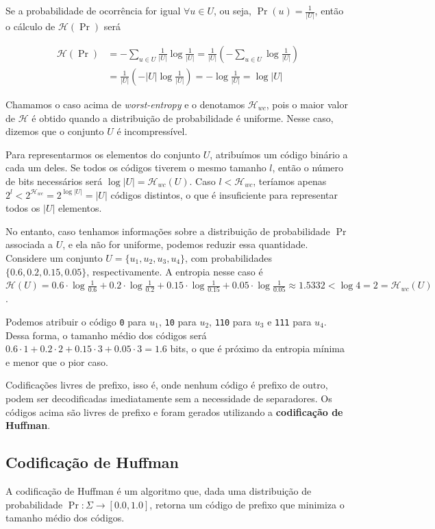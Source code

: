\documentclass[a4paper, 12pt, english, brazilian]{article}
\begin{document}
Se a probabilidade de ocorrência for igual $\forall u \in U$, ou seja, $\Pr(u) = \frac{1}{|U|}$, 
então o cálculo de $\mathcal{H}(\Pr)$ será

\begin{align*}
    \mathcal{H}(\Pr) &= -\sum_{u \in U}{\frac{1}{|U|}\log\frac{1}{|U|}} 
    = \frac{1}{|U|} \left(-\sum_{u \in U}{\log\frac{1}{|U|}}\right)\\
    &= \frac{1}{|U|} \left( -|U| \log\frac{1}{|U|} \right) = -\log\frac{1}{|U|} = \log|U|
\end{align*}

Chamamos o caso acima de \textit{worst-entropy} e o denotamos $\mathcal{H}_{wc}$, pois o maior valor de $\mathcal{H}$ é
obtido quando a distribuição de probabilidade é uniforme.  Nesse caso, dizemos que o 
conjunto $U$ é incompressível.

Para representarmos os elementos do conjunto $U$, atribuímos um código binário a cada um deles.
Se todos os códigos tiverem o mesmo tamanho $l$, então o número de bits necessários será 
$\log|U| = \mathcal{H}_{wc}(U)$. Caso $l <\mathcal{H}_{wc}$, teríamos apenas $2^{l} < 2^{\mathcal{H}_{wc}}
= 2^{\log|U|} = |U|$ códigos distintos, o que é insuficiente para representar todos os $|U|$ elementos.

No entanto, caso tenhamos informações sobre a distribuição de probabilidade $\Pr$ associada a $U$, e ela não
for uniforme, podemos reduzir essa quantidade. Considere um conjunto $U = \{u_1, u_2, u_3, u_4\}$,
com probabilidades $\{0.6, 0.2, 0.15, 0.05\}$, respectivamente. A entropia nesse caso é $\mathcal{H}(U) = 
0.6 \cdot \log\frac{1}{0.6} + 0.2 \cdot \log\frac{1}{0.2} 
+ 0.15 \cdot \log\frac{1}{0.15} + 0.05 \cdot \log\frac{1}{0.05} \approx 1.5332 < \log4 = 2 = \mathcal{H}_{wc}(U)$.

Podemos atribuir o código \texttt{0} para $u_1$, \texttt{10} para $u_2$, \texttt{110} para $u_3$ e \texttt{111}
para $u_4$. Dessa forma, o tamanho médio dos códigos será $0.6 \cdot 1 + 0.2 \cdot 2 + 0.15 \cdot 3 
+ 0.05 \cdot 3 = 1.6$ bits, o que é próximo da entropia mínima e menor que o pior caso.

Codificações livres de prefixo, isso é, onde nenhum código é prefixo de outro, podem ser decodificadas
imediatamente sem a necessidade de separadores. Os códigos acima são livres de prefixo e foram gerados
utilizando a \textbf{codificação de Huffman}.

\subsection{Codificação de Huffman}
A codificação de Huffman é um algoritmo que, dada uma distribuição de probabilidade $\Pr : \Sigma \to [0.0, 1.0]$, 
retorna um código de prefixo que minimiza o tamanho médio dos códigos.
\end{document}
